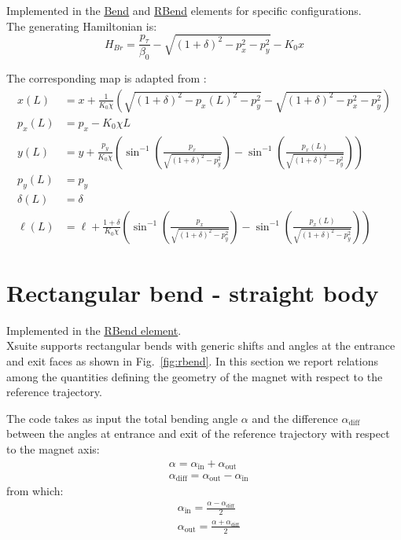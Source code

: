 Implemented in the \href{https://xsuite.readthedocs.io/en/latest/apireference.html#bend}{\underline{Bend}}
and \href{https://xsuite.readthedocs.io/en/latest/apireference.html#rbend}{\underline{RBend}} elements
for specific configurations.
~\\

The generating Hamiltonian is:
\begin{equation}
H_{Br} = \frac{p_\tau}{\beta_0} -\sqrt{(1 + \delta)^2 - p_x^2 - p_y^2} - K_0 x
\end{equation}

The corresponding map is adapted from \cite{forest99}:
\begin{align}
x(L) &= x + \frac{1}{K_0 \chi} \left( \sqrt{(1 + \delta)^2 - p_x(L)^2 - p_y^2} - \sqrt{(1 + \delta)^2 - p_x^2 - p_y^2} \right)
\label{eq:straight_bend_x}\\
p_x(L) &= p_x - K_0 \chi L \label{eq:straight_bend_px}\\
y(L) &= y + \frac{p_y}{K_0 \chi} \left( \sin^{-1} \left( \frac{p_x}{\sqrt{(1 + \delta)^2 - p_y^2}} \right) - \sin^{-1} \left( \frac{p_x(L)}{\sqrt{(1 + \delta)^2 - p_y^2}} \right) \right) \\
p_y(L) &= p_y \\
\delta(L) &= \delta \\
\ell(L) &= \ell +
\frac{1 + \delta}{K_0 \chi} \left( \sin^{-1} \left( \frac{p_x}{\sqrt{(1 + \delta)^2 - p_y^2}} \right) - \sin^{-1} \left( \frac{p_x(L)}{\sqrt{(1 + \delta)^2 - p_y^2}} \right) \right)
\label{eq:straight_bend_ell}
\end{align}

\section{Rectangular bend - straight body}

Implemented in the \href{https://xsuite.readthedocs.io/en/latest/apireference.html#rbend}{\underline{RBend element}}.
~\\

Xsuite supports rectangular bends with generic shifts and angles at the
entrance and exit faces as shown in Fig.~\ref{fig:rbend}. In this section we report
relations among the quantities defining the geometry of the magnet with respect
to the reference trajectory.

The code takes as input the total bending angle $\alpha$ and the difference
$\alpha_\text{diff}$ between the angles at entrance and exit of the reference
trajectory with respect to the magnet axis:
\begin{align}
&\alpha = \alpha_\text{in} + \alpha_\text{out} \\
&\alpha_\text{diff} = \alpha_\text{out} - \alpha_\text{in}
\end{align}
from which:
\begin{align}
&\alpha_\text{in} = \frac{\alpha - \alpha_\text{diff}}{2} \\
&\alpha_\text{out} = \frac{\alpha + \alpha_\text{diff}}{2}
\end{align}


